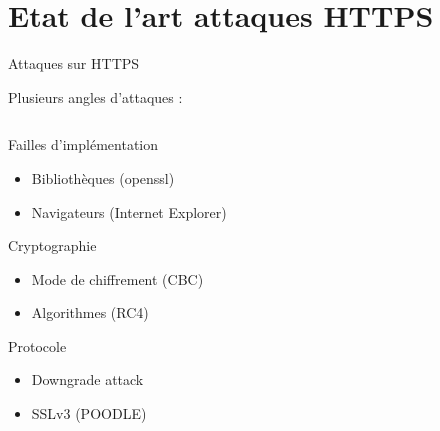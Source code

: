 \section{Etat de l'art attaques HTTPS}


\begin{frame}{Attaques sur HTTPS}

  {\Large \centerline{Plusieurs angles d'attaques :}}

  \begin{columns}
    \begin{column}{0.5\textwidth}
      \begin{exampleblock}{Failles d'implémentation}
        \begin{itemize}
        \item Bibliothèques (openssl)
        \item Navigateurs (Internet Explorer)
        \end{itemize}
      \end{exampleblock}

      \begin{exampleblock}{Cryptographie}
        \begin{itemize}
        \item Mode de chiffrement (CBC)
        \item Algorithmes (RC4)
        \end{itemize}
      \end{exampleblock}

      \begin{exampleblock}{Protocole}
        \begin{itemize}
        \item{Downgrade attack}
        \item{SSLv3 (POODLE)}
        \end{itemize}
      \end{exampleblock}
    \end{column}


\end{columns}
\end{frame}
